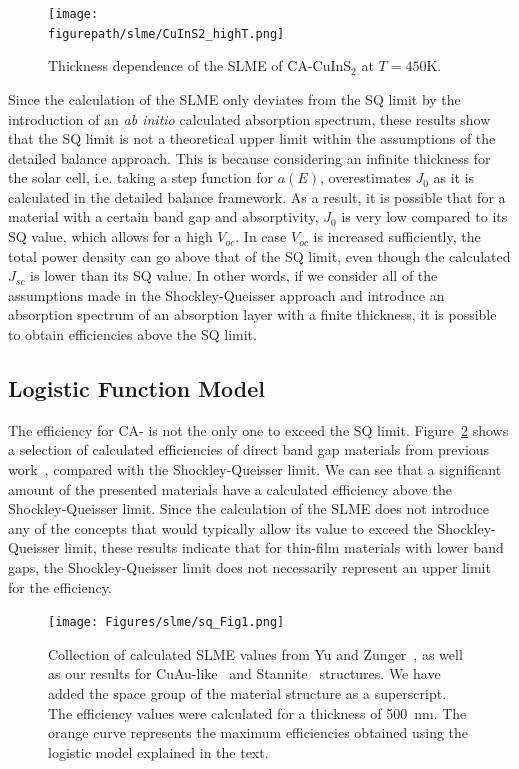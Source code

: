 \begin{refsection}
\begin{figure}[ht] 
	\centering 
		\texttt{[image: \\figurepath/slme/CuInS2\_highT.png]} 
	\caption{Thickness dependence of the SLME of CA-CuInS$_2$ at $T = 
450$\si{\kelvin}.} 
	\label{slme:fig-SLME_highT} 
\end{figure} 
 
Since the calculation of the SLME only deviates from the SQ limit by the 
introduction of an \textit{ab initio} calculated absorption spectrum, these 
results show that the SQ limit is not a theoretical upper limit within the 
assumptions of the detailed balance approach. This is because considering an 
infinite thickness for the solar cell, i.e. taking a step function for $a(E)$, 
overestimates $J_0$ as it is calculated in the detailed balance framework. As 
a result, it is possible that for a material with a certain band gap and 
absorptivity, $J_0$ is very low compared to its SQ value, which allows for a 
high $V_{oc}$. In case $V_{oc}$ is increased sufficiently, the total power 
density can go above that of the SQ limit, even though the calculated $J_{sc}$ 
is lower than its SQ value. In other words, if we consider all of the 
assumptions made in the Shockley-Queisser approach and introduce an absorption 
spectrum of an absorption layer with a finite thickness, it is possible to 
obtain efficiencies above the SQ limit. 
 
\subsection{Logistic Function Model} \label{slme:sec-logistic} 
 
The efficiency for CA- is not the only one to exceed the SQ limit. 
Figure~\ref{slme:fig-logistic} shows a selection of calculated efficiencies of 
direct band gap materials from previous work~\cite{Yu2012, Bercx2016, 
Sarmadian2016}, compared with the Shockley-Queisser limit.  We can see that a 
significant amount of the presented materials have a calculated efficiency 
above the Shockley-Queisser limit. Since the calculation of the SLME does not 
introduce any of the concepts that would typically allow its value to exceed 
the Shockley-Queisser limit, these results indicate that for thin-film 
materials with lower band gaps, the Shockley-Queisser limit does not 
necessarily represent an upper limit for the efficiency. 
 
\begin{figure}[ht] 
\centering 
\texttt{[image: Figures/slme/sq\_Fig1.png]} 
\caption{Collection of calculated SLME values from Yu and 
Zunger~\cite{Yu2012}, as well as our results for CuAu-like~\cite{Bercx2016} 
and Stannite~\cite{Sarmadian2016} structures. We have added the space group of 
the material structure as a superscript. The efficiency values were calculated 
for a thickness of 500~\si{\nano\meter}. The orange curve represents the 
maximum efficiencies obtained using the logistic model explained in the text.} 
\label{slme:fig-logistic} 
\end{figure} 
 

\end{refsection}
